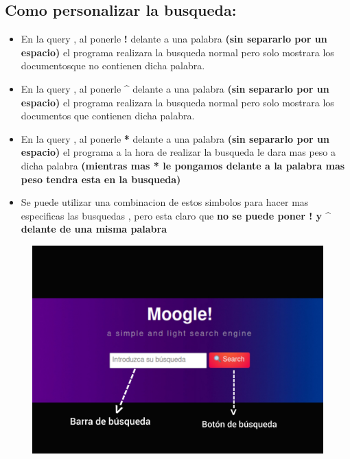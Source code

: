 \documentclass[a4paper,12pt]{article}
\begin{document}
\subsection{Como personalizar la busqueda:}

\begin{itemize}
    \item En la query , al ponerle \textbf{!} delante a una palabra \textbf{(sin separarlo por un espacio)} el programa realizara la busqueda normal pero solo mostrara los documentosque no contienen dicha palabra.   
    \item En la query , al ponerle \textbf{\^{}} delante a una palabra \textbf{(sin separarlo por un espacio)} el programa realizara la busqueda normal pero solo mostrara los documentos que contienen dicha palabra. 
    \item En la query , al ponerle \textbf{*} delante a una palabra \textbf{(sin separarlo por un espacio)} el programa a la hora de realizar la busqueda le dara mas peso a dicha palabra \textbf{(mientras mas * le pongamos delante a la palabra mas peso tendra esta en la busqueda)}
    \item Se puede utilizar una combinacion de estos simbolos para hacer mas especificas las busquedas , pero esta claro que \textbf{no se puede poner ! y \^{} delante de una misma palabra}
\end{itemize}

\begin{figure}[h]
    \centering
    \includegraphics[width=\textwidth]{imagenes/ejemplo.jpg}
\end{figure}
\end{document}
